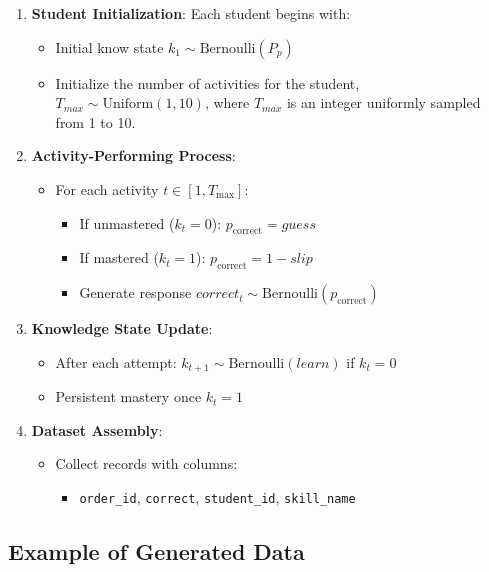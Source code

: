 \documentclass{article}
\begin{document}
\begin{enumerate}
    \item \textbf{Student Initialization}: Each student begins with:
    \begin{itemize}
        \item Initial know state $k_1 \sim \text{Bernoulli}(P_p)$
        \item Initialize the number of activities for the student, $T_{max} \sim \text{Uniform}(1, 10)$, where $T_{max}$ is an integer uniformly sampled from 1 to 10.
    \end{itemize}
    
    \item \textbf{Activity-Performing Process}:
    \begin{itemize}
        \item For each activity $t \in [1, T_{\text{max}}]$:
        \begin{itemize}
            \item If unmastered ($k_t=0$): $p_{\text{correct}} = guess$
            \item If mastered ($k_t=1$): $p_{\text{correct}} = 1-slip$
            \item Generate response $correct_t \sim \text{Bernoulli}(p_{\text{correct}})$
        \end{itemize}
    \end{itemize}
    
    \item \textbf{Knowledge State Update}:
    \begin{itemize}
        \item After each attempt: $k_{t+1} \sim \text{Bernoulli}(learn)$ if $k_t=0$
        \item Persistent mastery once $k_t=1$
    \end{itemize}
    
    \item \textbf{Dataset Assembly}:
    \begin{itemize}
        \item Collect records with columns: 
        \begin{itemize}
            \item \texttt{order\_id}, \texttt{correct}, \texttt{student\_id}, \texttt{skill\_name}
        \end{itemize}
    \end{itemize}
\end{enumerate}

\subsection{Example of Generated Data}
\end{document}

